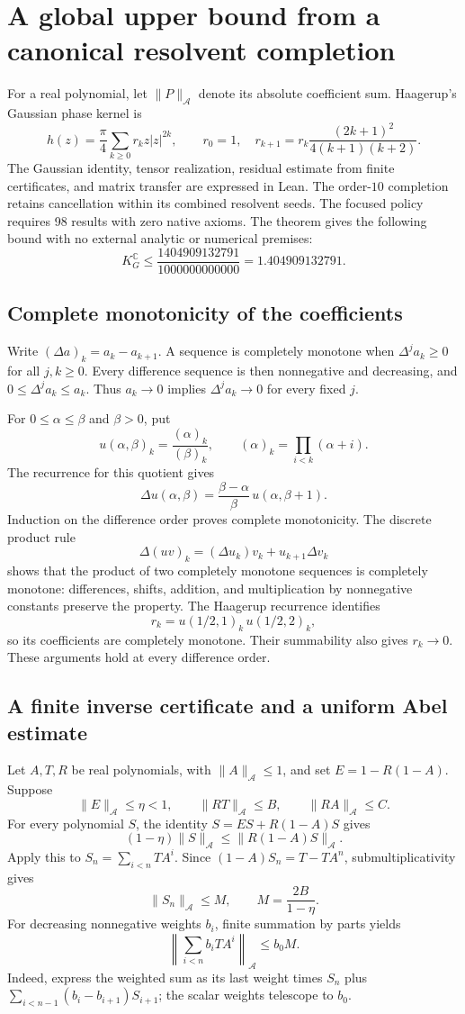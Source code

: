 \section{A global upper bound from a canonical resolvent completion}
For a real polynomial, let $\|P\|_{\mathcal A}$ denote its absolute
coefficient sum. Haagerup's Gaussian phase kernel is
\[
 h(z)=\frac\pi4\sum_{k\ge0}r_kz|z|^{2k},\qquad
 r_0=1,\quad r_{k+1}=r_k\frac{(2k+1)^2}{4(k+1)(k+2)}.
\]
The Gaussian identity, tensor realization, residual estimate from finite
certificates, and matrix transfer are expressed in Lean. The order-$10$ completion
retains cancellation within its combined resolvent seeds.
The focused policy requires 98 results with zero native axioms.
The theorem gives the following bound with no external analytic or numerical premises:
\[
 \boxed{K_G^{\mathbb C}\le\frac{1404909132791}{1000000000000}=1.404909132791.}
\]

\subsection{Complete monotonicity of the coefficients}
Write $(\Delta a)_k=a_k-a_{k+1}$. A sequence is completely monotone when
$\Delta^j a_k\ge0$ for all $j,k\ge0$. Every difference sequence is then
nonnegative and decreasing, and
$0\le\Delta^j a_k\le a_k$. Thus $a_k\to0$ implies
$\Delta^j a_k\to0$ for every fixed $j$.

For $0\le\alpha\le\beta$ and $\beta>0$, put
\[
 u(\alpha,\beta)_k=\frac{(\alpha)_k}{(\beta)_k},
 \qquad (\alpha)_k=\prod_{i<k}(\alpha+i).
\]
The recurrence for this quotient gives
\[
 \Delta u(\alpha,\beta)
 =\frac{\beta-\alpha}{\beta}\,u(\alpha,\beta+1).
\]
Induction on the difference order proves complete monotonicity.
The discrete product rule
\[
 \Delta(uv)_k=(\Delta u_k)v_k+u_{k+1}\Delta v_k
\]
shows that the product of two completely monotone sequences is completely
monotone: differences, shifts, addition, and multiplication by nonnegative
constants preserve the property. The Haagerup recurrence identifies
\[
 r_k=u(1/2,1)_k\,u(1/2,2)_k,
\]
so its coefficients are completely monotone. Their summability also gives
$r_k\to0$. These arguments hold at every difference order.

\subsection{A finite inverse certificate and a uniform Abel estimate}
Let $A,T,R$ be real polynomials, with $\|A\|_{\mathcal A}\le1$, and set
$E=1-R(1-A)$. Suppose
\[
 \|E\|_{\mathcal A}\le\eta<1,
 \qquad \|RT\|_{\mathcal A}\le B,
 \qquad \|RA\|_{\mathcal A}\le C.
\]
For every polynomial $S$, the identity $S=ES+R(1-A)S$ gives
\[
 (1-\eta)\|S\|_{\mathcal A}\le\|R(1-A)S\|_{\mathcal A}.
\]
Apply this to $S_n=\sum_{i<n}TA^i$. Since
$(1-A)S_n=T-TA^n$, submultiplicativity gives
\[
 \|S_n\|_{\mathcal A}\le M,\qquad M=\frac{2B}{1-\eta}.
\]
For decreasing nonnegative weights $b_i$, finite summation by parts yields
\[
 \left\|\sum_{i<n}b_iTA^i\right\|_{\mathcal A}\le b_0M.
\]
Indeed, express the weighted sum as its last weight times $S_n$ plus
$\sum_{i<n-1}(b_i-b_{i+1})S_{i+1}$; the scalar weights telescope to $b_0$.

